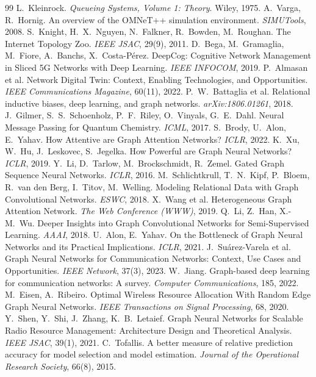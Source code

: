 \documentclass[11pt,a4paper]{report}
\begin{document}
\begin{thebibliography}{99}
 L.~Kleinrock. \emph{Queueing Systems, Volume 1: Theory}. Wiley, 1975.
 A.~Varga, R.~Hornig. An overview of the OMNeT++ simulation environment. \emph{SIMUTools}, 2008.
 S.~Knight, H.~X.~Nguyen, N.~Falkner, R.~Bowden, M.~Roughan. The Internet Topology Zoo. \emph{IEEE JSAC}, 29(9), 2011.
 D.~Bega, M.~Gramaglia, M.~Fiore, A.~Banchs, X.~Costa-Pérez. DeepCog: Cognitive Network Management in Sliced 5G Networks with Deep Learning. \emph{IEEE INFOCOM}, 2019.
 P.~Almasan et al. Network Digital Twin: Context, Enabling Technologies, and Opportunities. \emph{IEEE Communications Magazine}, 60(11), 2022.
 P.~W.~Battaglia et al. Relational inductive biases, deep learning, and graph networks. \emph{arXiv:1806.01261}, 2018.
 J.~Gilmer, S.~S.~Schoenholz, P.~F.~Riley, O.~Vinyals, G.~E.~Dahl. Neural Message Passing for Quantum Chemistry. \emph{ICML}, 2017.
 S.~Brody, U.~Alon, E.~Yahav. How Attentive are Graph Attention Networks? \emph{ICLR}, 2022.
 K.~Xu, W.~Hu, J.~Leskovec, S.~Jegelka. How Powerful are Graph Neural Networks? \emph{ICLR}, 2019.
 Y.~Li, D.~Tarlow, M.~Brockschmidt, R.~Zemel. Gated Graph Sequence Neural Networks. \emph{ICLR}, 2016.
 M.~Schlichtkrull, T.~N.~Kipf, P.~Bloem, R.~van den Berg, I.~Titov, M.~Welling. Modeling Relational Data with Graph Convolutional Networks. \emph{ESWC}, 2018.
 X.~Wang et al. Heterogeneous Graph Attention Network. \emph{The Web Conference (WWW)}, 2019.
 Q.~Li, Z.~Han, X.-M.~Wu. Deeper Insights into Graph Convolutional Networks for Semi-Supervised Learning. \emph{AAAI}, 2018.
 U.~Alon, E.~Yahav. On the Bottleneck of Graph Neural Networks and its Practical Implications. \emph{ICLR}, 2021.
 J.~Suárez-Varela et al. Graph Neural Networks for Communication Networks: Context, Use Cases and Opportunities. \emph{IEEE Network}, 37(3), 2023.
 W.~Jiang. Graph-based deep learning for communication networks: A survey. \emph{Computer Communications}, 185, 2022.
 M.~Eisen, A.~Ribeiro. Optimal Wireless Resource Allocation With Random Edge Graph Neural Networks. \emph{IEEE Transactions on Signal Processing}, 68, 2020.
 Y.~Shen, Y.~Shi, J.~Zhang, K.~B.~Letaief. Graph Neural Networks for Scalable Radio Resource Management: Architecture Design and Theoretical Analysis. \emph{IEEE JSAC}, 39(1), 2021.
 C.~Tofallis. A better measure of relative prediction accuracy for model selection and model estimation. \emph{Journal of the Operational Research Society}, 66(8), 2015.

\end{thebibliography}
\end{document}
